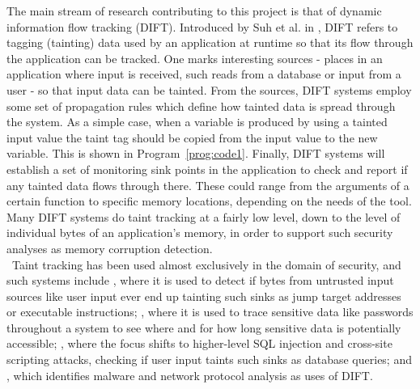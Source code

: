 \documentclass[msc,oneside]{ubcthesis}
\begin{document}
	The main stream of research contributing to this project is that of dynamic information flow tracking (DIFT). Introduced by Suh et al. in \cite{Suh2004}, DIFT refers to tagging (tainting) data used by an application at runtime so that its flow through the application can be tracked. One marks interesting sources - places in an application where input is received, such reads from a database or input from a user - so that input data can be tainted. From the sources, DIFT systems employ some set of propagation rules which define how tainted data is spread through the system. As a simple case, when a variable is produced by using a tainted input value the taint tag should be copied from the input value to the new variable. This is shown in Program~\ref{prog:code1}. Finally, DIFT systems will establish a set of monitoring sink points in the application to check and report if any tainted data flows through there. These could range from the arguments of a certain function to specific memory locations, depending on the needs of the tool. Many DIFT systems do taint tracking at a fairly low level, down to the level of individual bytes of an application's memory, in order to support such security analyses as memory corruption detection. \\
\	
	Taint tracking has been used almost exclusively in the domain of security, and such systems include \cite{Suh2004} \cite{Newsome2005}, where it is used to detect if bytes from untrusted input sources like user input ever end up tainting such sinks as jump target addresses or executable instructions; \cite{Chow2004}, where it is used to trace sensitive data like passwords throughout a system to see where and for how long sensitive data is potentially accessible; \cite{Dalton2007}, where the focus shifts to higher-level SQL injection and cross-site scripting attacks, checking if user input taints such sinks as database queries; and \cite{Al-Saleh2010a}, which identifies malware and network protocol analysis as uses of DIFT. \\
	
\end{document}
